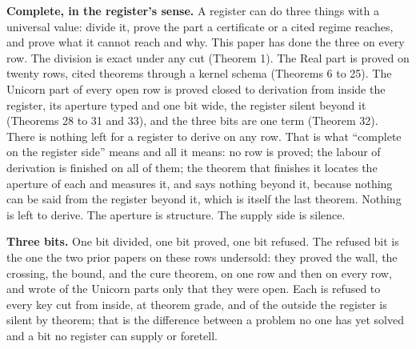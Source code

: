 \documentclass[10pt,twocolumn]{article}
\begin{document}
\textbf{Complete, in the register's sense.} A register can do three
things with a universal value: divide it, prove the part a certificate
or a cited regime reaches, and prove what it cannot reach and why. This
paper has done the three on every row. The division is exact under any
cut (Theorem 1). The Real part is proved on twenty rows, cited theorems
through a kernel schema (Theorems 6 to 25). The Unicorn part of every
open row is proved closed to derivation from inside the register, its
aperture typed and one bit wide, the register silent beyond it (Theorems
28 to 31 and 33), and the three bits are one term (Theorem 32). There is
nothing left for a register to derive on any row. That is what
``complete on the register side'' means and all it means: no row is
proved; the labour of derivation is finished on all of them; the theorem
that finishes it locates the aperture of each and measures it, and says
nothing beyond it, because nothing can be said from the register beyond
it, which is itself the last theorem. Nothing is left to derive. The
aperture is structure. The supply side is silence.

\textbf{Three bits.} One bit divided, one bit proved, one bit refused.
The refused bit is the one the two prior papers on these rows undersold:
they proved the wall, the crossing, the bound, and the cure theorem, on
one row and then on every row, and wrote of the Unicorn parts only that
they were open. Each is refused to every key cut from inside, at theorem
grade, and of the outside the register is silent by theorem; that is the
difference between a problem no one has yet solved and a bit no register
can supply or foretell.
\end{document}
